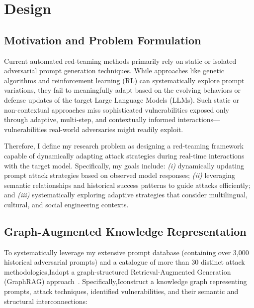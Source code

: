 \section{Design}

\subsection{Motivation and Problem Formulation}

Current automated red-teaming methods primarily rely on static or isolated adversarial prompt generation techniques. While approaches like genetic algorithms and reinforcement learning (RL) can systematically explore prompt variations, they fail to meaningfully adapt based on the evolving behaviors or defense updates of the target Large Language Models (LLMs). Such static or non-contextual approaches miss sophisticated vulnerabilities exposed only through adaptive, multi-step, and contextually informed interactions—vulnerabilities real-world adversaries might readily exploit.

Therefore, I define my research problem as designing a red-teaming framework capable of dynamically adapting attack strategies during real-time interactions with the target model. Specifically, my goals include: 
\textit{(i)} dynamically updating prompt attack strategies based on observed model responses; 
\textit{(ii)} leveraging semantic relationships and historical success patterns to guide attacks efficiently; and 
\textit{(iii)} systematically exploring adaptive strategies that consider multilingual, cultural, and social engineering contexts.

\subsection{Graph-Augmented Knowledge Representation}

To systematically leverage my extensive prompt database (containing over 3,000 historical adversarial prompts) and a catalogue of more than 30 distinct attack methodologies,Iadopt a graph-structured Retrieval-Augmented Generation (GraphRAG) approach~\cite{GraphRAG}. Specifically,Iconstruct a knowledge graph representing prompts, attack techniques, identified vulnerabilities, and their semantic and structural interconnections:

